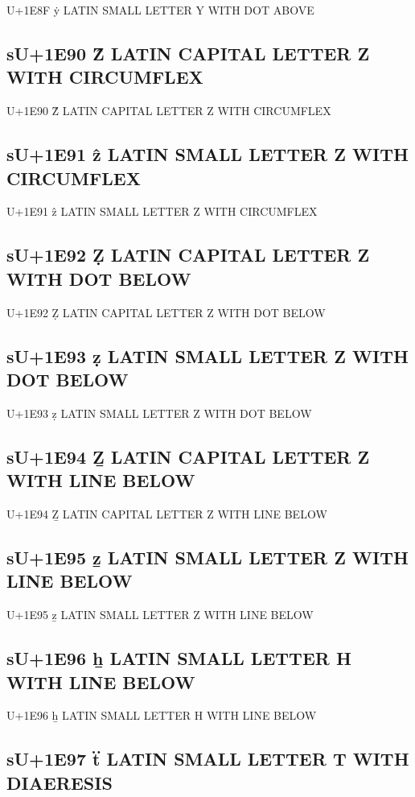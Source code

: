U+1E8F ẏ LATIN SMALL LETTER Y WITH DOT ABOVE

\subsection{sU+1E90 Ẑ LATIN CAPITAL LETTER Z WITH CIRCUMFLEX}

U+1E90 Ẑ LATIN CAPITAL LETTER Z WITH CIRCUMFLEX

\subsection{sU+1E91 ẑ LATIN SMALL LETTER Z WITH CIRCUMFLEX}

U+1E91 ẑ LATIN SMALL LETTER Z WITH CIRCUMFLEX

\subsection{sU+1E92 Ẓ LATIN CAPITAL LETTER Z WITH DOT BELOW}

U+1E92 Ẓ LATIN CAPITAL LETTER Z WITH DOT BELOW

\subsection{sU+1E93 ẓ LATIN SMALL LETTER Z WITH DOT BELOW}

U+1E93 ẓ LATIN SMALL LETTER Z WITH DOT BELOW

\subsection{sU+1E94 Ẕ LATIN CAPITAL LETTER Z WITH LINE BELOW}

U+1E94 Ẕ LATIN CAPITAL LETTER Z WITH LINE BELOW

\subsection{sU+1E95 ẕ LATIN SMALL LETTER Z WITH LINE BELOW}

U+1E95 ẕ LATIN SMALL LETTER Z WITH LINE BELOW

\subsection{sU+1E96 ẖ LATIN SMALL LETTER H WITH LINE BELOW}

U+1E96 ẖ LATIN SMALL LETTER H WITH LINE BELOW

\subsection{sU+1E97 ẗ LATIN SMALL LETTER T WITH DIAERESIS}

